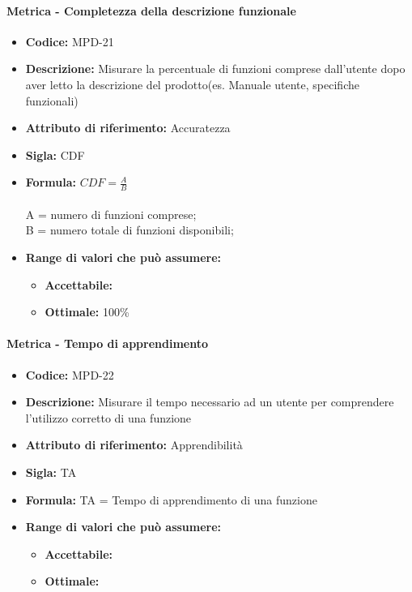                   \paragraph{Metrica - Completezza della descrizione funzionale} 
            \begin{itemize}
           \item   \textbf{Codice:} MPD-21
           \item   \textbf{Descrizione:} Misurare la percentuale di funzioni comprese dall'utente dopo aver letto la descrizione del prodotto(es. Manuale utente, specifiche funzionali) 
           \item    \textbf{Attributo di riferimento:} Accuratezza
           \item   \textbf{Sigla:} CDF
           \item   \textbf{Formula:} \begin{math}CDF = \frac{A}{B}\end{math}\\ \\
            A = numero di funzioni comprese;\\
            B = numero totale di funzioni disponibili;
            \item \textbf{Range di valori che può assumere:}
        \begin{itemize}
            \item \textbf{Accettabile:} 
            \item \textbf{Ottimale:} 100\%
        \end{itemize}
       \end{itemize}
       
                  \paragraph{Metrica - Tempo di apprendimento} 
            \begin{itemize}
           \item   \textbf{Codice:} MPD-22
          \item    \textbf{Descrizione:} Misurare il tempo necessario ad un utente per comprendere l'utilizzo corretto di una funzione
            \item   \textbf{Attributo di riferimento:} Apprendibilità
            \item  \textbf{Sigla:} TA
            \item  \textbf{Formula:} TA = Tempo di apprendimento di una funzione 
             
            \item \textbf{Range di valori che può assumere:}
        \begin{itemize}
            \item \textbf{Accettabile:} 
            \item \textbf{Ottimale:} 
        \end{itemize}
       \end{itemize}
       
